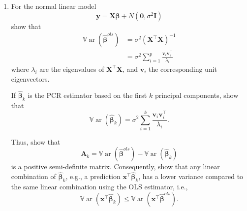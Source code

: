 \documentclass[
]{book}
\theoremstyle{definition}
\theoremstyle{definition}
\theoremstyle{definition}
\theoremstyle{definition}
\theoremstyle{remark}
\begin{document}
\begin{enumerate}
\def\labelenumi{\arabic{enumi}.}
\setcounter{enumi}{2}
\item
  For the normal linear model
  \[\mathbf y= \mathbf X\boldsymbol \beta+ N({\boldsymbol 0}, \sigma^2 \mathbf I)\]
  show that
  \begin{align}
  {\mathbb{V}\operatorname{ar}}(\hat{\boldsymbol \beta}^{ols}) &= \sigma^2 (\mathbf X^\top \mathbf X)^{-1}\\
  &= \sigma^2\sum_{i=1}^p \frac{\mathbf v_i \mathbf v_i^\top}{\lambda_i}
  \end{align}
  where \(\lambda_i\) are the eigenvalues of \(\mathbf X^\top \mathbf X\), and \(\mathbf v_i\) the corresponding unit eigenvectors.

  If \(\hat{\boldsymbol \beta}_k\) is the PCR estimator based on the first \(k\) principal components, show that
  \[{\mathbb{V}\operatorname{ar}}(\hat{\boldsymbol \beta}_k) = \sigma^2 \sum_{i=1}^k \frac{\mathbf v_i \mathbf v_i^\top}{\lambda_i}.\]

  Thus, show that \[\mathbf A_k = {\mathbb{V}\operatorname{ar}}(\hat{\boldsymbol \beta}^{ols})-{\mathbb{V}\operatorname{ar}}(\hat{\boldsymbol \beta}_k)\] is a positive semi-definite matrix. Consequently, show that any linear combination of \(\hat{\boldsymbol \beta}_k\), e.g., a prediction \(\mathbf x^\top \hat{\boldsymbol \beta}_k\), has a lower variance compared to the same linear combination using the OLS estimator, i.e.,
  \[{\mathbb{V}\operatorname{ar}}(\mathbf x^\top \hat{\boldsymbol \beta}_k)\leq {\mathbb{V}\operatorname{ar}}(\mathbf x^\top \hat{\boldsymbol \beta}^{ols}).\]
\end{enumerate}

  
\end{document}
